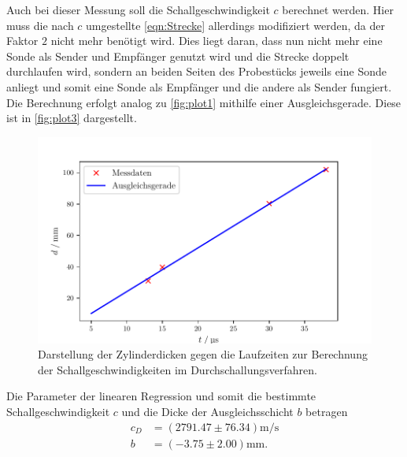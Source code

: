 Auch bei dieser Messung soll die Schallgeschwindigkeit $c$ berechnet werden.
Hier muss die nach $c$ umgestellte \autoref{eqn:Strecke} allerdings modifiziert werden, da der Faktor $2$ nicht mehr benötigt wird.
Dies liegt daran, dass nun nicht mehr eine Sonde als Sender und Empfänger genutzt wird und die Strecke doppelt durchlaufen wird, 
sondern an beiden Seiten des Probestücks jeweils eine Sonde anliegt und somit eine Sonde als Empfänger und die andere als Sender fungiert.
Die Berechnung erfolgt analog zu \autoref{fig:plot1} mithilfe einer Ausgleichsgerade. Diese ist in \autoref{fig:plot3} dargestellt.
\begin{figure}[H]
  \centering
  \includegraphics{build/plot3.pdf}
  \caption {Darstellung der Zylinderdicken gegen die Laufzeiten zur Berechnung der Schallgeschwindigkeiten im Durchschallungsverfahren.}
  \label{fig:plot3}
\end{figure}
Die Parameter der linearen Regression und somit die bestimmte Schallgeschwindigkeit $c$ und die Dicke der Ausgleichsschicht $b$ betragen
\begin{align*}
  c_{D}& =( 2791.47\pm 76.34 ) \si{\meter\per\second}\\
  b &= (-3.75\pm 2.00) \si{\milli\meter}.
\end{align*}



